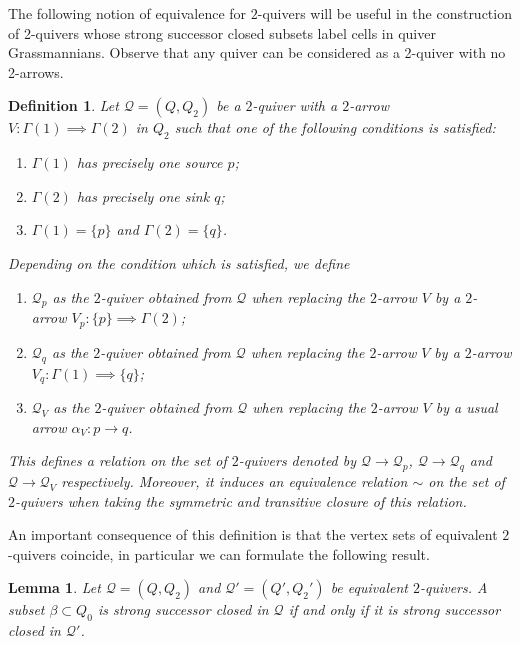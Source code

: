 \documentclass{amsart}
\newtheorem{definition}[theorem]{Definition}
\newtheorem{lemma}[theorem]{Lemma}
\numberwithin{equation}{section}
\newcommand{\cQ}{\mathcal{Q}}
\begin{document}
The following notion of equivalence for $2$-quivers will be useful in the construction of 2-quivers whose strong successor closed subsets label cells in quiver Grassmannians.
Observe that any quiver can be considered as a 2-quiver with no 2-arrows.
\begin{definition}
  \label{def:2equivalence}
  Let $\cQ=(Q,Q_2)$ be a $2$-quiver with a $2$-arrow $V:\Gamma(1)\implies\Gamma(2)$ in $Q_2$ such that one of the following conditions is satisfied:
  \begin{enumerate}
    \item $\Gamma(1)$ has precisely one source $p$; 
    \item $\Gamma(2)$ has precisely one sink $q$;
    \item $\Gamma(1)=\{p\}$ and $\Gamma(2)=\{q\}$.
  \end{enumerate}
  Depending on the condition which is satisfied, we define
  \begin{enumerate}
    \item $\cQ_p$ as the $2$-quiver obtained from $\cQ$ when replacing the $2$-arrow $V$ by a $2$-arrow $V_p:\{p\}\implies\Gamma(2)$;
    \item $\cQ_q$ as the $2$-quiver obtained from $\cQ$ when replacing the $2$-arrow $V$ by a $2$-arrow $V_q:\Gamma(1)\implies\{q\}$;
    \item $\cQ_V$ as the $2$-quiver obtained from $\cQ$ when replacing the $2$-arrow $V$ by a usual arrow $\alpha_V:p\to q$. 
  \end{enumerate}
  This defines a relation on the set of $2$-quivers denoted by $\cQ\to\cQ_p$, $\cQ\to\cQ_q$ and $\cQ\to\cQ_V$ respectively.
  Moreover, it induces an equivalence relation $\sim$ on the set of $2$-quivers when taking the symmetric and transitive closure of this relation. 
\end{definition}

An important consequence of this definition is that the vertex sets of equivalent $2$-quivers coincide, in particular we can formulate the following result.
\begin{lemma}
  \label{lem:2equivalence}
  Let $\cQ=(Q,Q_2)$ and $\cQ'=(Q',Q_2')$ be equivalent $2$-quivers.
  A subset $\beta\subset Q_0$ is strong successor closed in $\cQ$ if and only if it is strong successor closed in $\cQ'$.
\end{lemma}
\end{document}
